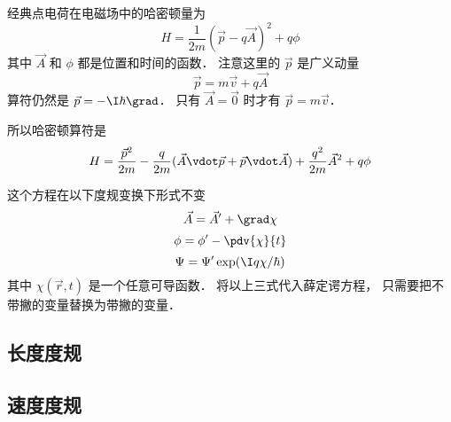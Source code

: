 

经典点电荷在电磁场中的哈密顿量为
\begin{equation}
H = \frac{1}{2m}(\vec p - q\vec A)^2 + q\phi
\end{equation}
其中 $\vec A$ 和 $\phi$ 都是位置和时间的函数． 注意这里的 $\vec p$ 是广义动量
\begin{equation}
\vec p = m\vec v + q\vec A
\end{equation}
算符仍然是 ${\vec p} = -\I\hbar\grad$． 只有 $\vec A = \vec 0$ 时才有 $\vec p = m\vec v$．

所以哈密顿算符是
\begin{equation}
H = \frac{\vec p^2}{2m} - \frac{q}{2m}(\vec A\vdot \vec p + \vec p \vdot \vec A) + \frac{q^2}{2m} \vec A^2 + q\phi
\end{equation}

这个方程在以下度规变换下形式不变
\begin{equation}
\vec A = \vec A' + \grad \chi
\end{equation}
\begin{equation}
\phi = \phi' - \pdv{\chi}{t}
\end{equation}
\begin{equation}
\Psi = \Psi' \exp(\I q\chi/\hbar)
\end{equation}
其中 $\chi(\vec r, t)$ 是一个任意可导函数． 将以上三式代入薛定谔方程， 只需要把不带撇的变量替换为带撇的变量．

\subsection{长度度规}

\subsection{速度度规}
